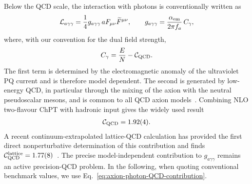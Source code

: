 \documentclass[review]{elsarticle}
\numberwithin{equation}{section}
\numberwithin{table}{section}
\numberwithin{figure}{section}
\begin{document}
Below the QCD scale, the interaction with photons is conventionally written as
\begin{align}
    \mathcal{L}_{a\gamma\gamma} = \frac{1}{4} g_{a\gamma\gamma}\, aF_{\mu\nu}\widetilde F^{\mu\nu},
    \qquad
    g_{a\gamma\gamma} = \frac{\alpha_{\rm em}}{2\pi f_a}\,
    C_\gamma ,
    \label{eq:axion-photon-coupling}
\end{align}
where, with our convention for the dual field strength,
\begin{align}
    C_\gamma = \frac{E}{N} - \mathcal{C}_{\rm QCD}.
    \label{eq:axion-photon-Cgamma}
\end{align}
The first term is determined by the electromagnetic anomaly of the ultraviolet PQ current and is therefore model dependent. The second is generated by low-energy QCD, in particular through the mixing of the axion with the neutral pseudoscalar mesons, and is common to all QCD axion models~\cite{Srednicki:1985xd,Georgi:1986df,GrilliDiCortona:2015jxo}. Combining NLO two-flavour ChPT with hadronic input gives the widely used result~\cite{GrilliDiCortona:2015jxo}
\begin{align}
    \mathcal{C}_{\rm QCD} = 1.92(4).
    \label{eq:axion-photon-QCD-contribution}
\end{align}
A recent continuum-extrapolated lattice-QCD calculation has provided the first direct nonperturbative determination of this contribution and finds $\mathcal{C}_{\rm QCD}^{\rm lattice}=1.77(8)$~\cite{Brandt:2026wir}.
The precise model-independent contribution to $g_{a\gamma\gamma}$ remains an active precision-QCD problem. In the following, when quoting conventional benchmark values, we use Eq.~\eqref{eq:axion-photon-QCD-contribution}.
\end{document}
